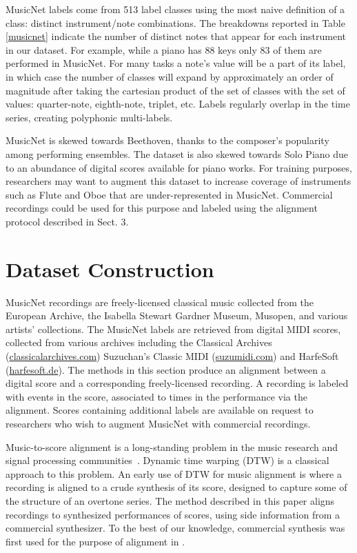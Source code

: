 \documentclass{article} \usepackage{iclr2017_conference,times}
\begin{document}
\fi

MusicNet labels come from 513 label classes using the most naive definition of a class: distinct instrument/note combinations.  The breakdowns reported in Table \ref{musicnet} indicate the number of distinct notes that appear for each instrument in our dataset. For example, while a piano has 88 keys only 83 of them are performed in MusicNet.  For many tasks a note's value will be a part of its label, in which case the number of classes will expand by approximately an order of magnitude after taking the cartesian product of the set of classes with the set of values: quarter-note, eighth-note, triplet, etc. Labels regularly overlap in the time series, creating polyphonic multi-labels.

MusicNet is skewed towards Beethoven, thanks to the composer's popularity among performing ensembles. The dataset is also skewed towards Solo Piano due to an abundance of digital scores available for piano works. For training purposes, researchers may want to augment this dataset to increase coverage of instruments such as Flute and Oboe that are under-represented in MusicNet. Commercial recordings could be used for this purpose and labeled using the alignment protocol described in Sect. 3.



 \section{Dataset Construction}

MusicNet recordings are freely-licensed classical music collected from the European Archive, the Isabella Stewart Gardner Museum, Musopen, and various artists' collections. The MusicNet labels are retrieved from digital MIDI scores, collected from various archives including the Classical Archives (\url{classicalarchives.com}) Suzuchan's Classic MIDI (\url{suzumidi.com}) and HarfeSoft (\url{harfesoft.de}). The methods in this section produce an alignment between a digital score and a corresponding freely-licensed recording. A recording is labeled with events in the score, associated to times in the performance via the alignment. Scores containing  additional labels are available on request to researchers who wish to augment MusicNet with commercial recordings.

Music-to-score alignment is a long-standing problem in the music research and signal processing communities~\citep{raphael99}. Dynamic time warping (DTW) is a classical approach to this problem. An early use of DTW for music alignment is \cite{orio} where a recording is aligned to a crude synthesis of its score, designed to capture some of the structure of an overtone series. The method described in this paper aligns recordings to synthesized performances of scores, using side information from a commercial synthesizer. To the best of our knowledge, commercial synthesis was first used for the purpose of alignment in \cite{turetsky}.
\end{document}
